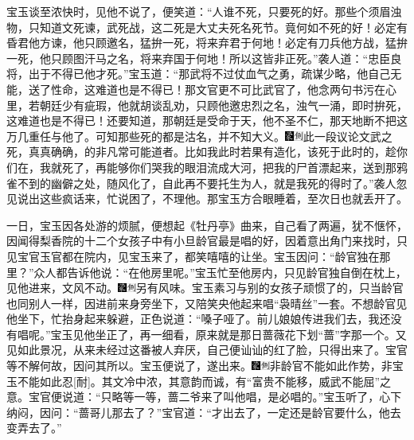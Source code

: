 宝玉谈至浓快时，见他不说了，便笑道：``人谁不死，只要死的好。那些个须眉浊物，只知道文死谏，武死战，这二死是大丈夫死名死节。竟何如不死的好！必定有昏君他方谏，他只顾邀名，猛拚一死，将来弃君于何地！必定有刀兵他方战，猛拚一死，他只顾图汗马之名，将来弃国于何地！所以这皆非正死。''袭人道：``忠臣良将，出于不得已他才死。''宝玉道：``那武将不过仗血气之勇，疏谋少略，他自己无能，送了性命，这难道也是不得已！那文官更不可比武官了，他念两句书污在心里，若朝廷少有疵瑕，他就胡谈乱劝，只顾他邀忠烈之名，浊气一涌，即时拚死，这难道也是不得已！还要知道，那朝廷是受命于天，他不圣不仁，那天地断不把这万几重任与他了。可知那些死的都是沽名，并不知大义。{\includegraphics[width=3mm]{../Images/00006}\includegraphics[width=3mm]{../Images/00011}\footnotesize \kaishu 此一段议论文武之死，真真确确，的非凡常可能道者。}比如我此时若果有造化，该死于此时的，趁你们在，我就死了，再能够你们哭我的眼泪流成大河，把我的尸首漂起来，送到那鸦雀不到的幽僻之处，随风化了，自此再不要托生为人，就是我死的得时了。''袭人忽见说出这些疯话来，忙说困了，不理他。那宝玉方合眼睡着，至次日也就丢开了。

一日，宝玉因各处游的烦腻，便想起《牡丹亭》曲来，自己看了两遍，犹不惬怀，因闻得梨香院的十二个女孩子中有小旦龄官最是唱的好，因着意出角门来找时，只见宝官玉官都在院内，见宝玉来了，都笑嘻嘻的让坐。宝玉因问：``龄官独在那里？''众人都告诉他说：``在他房里呢。''宝玉忙至他房内，只见龄官独自倒在枕上，见他进来，文风不动。{\includegraphics[width=3mm]{../Images/00006}\includegraphics[width=3mm]{../Images/00011}\footnotesize \kaishu 另有风味。}宝玉素习与别的女孩子顽惯了的，只当龄官也同别人一样，因进前来身旁坐下，又陪笑央他起来唱``袅晴丝''一套。不想龄官见他坐下，忙抬身起来躲避，正色说道：``嗓子哑了。前儿娘娘传进我们去，我还没有唱呢。''宝玉见他坐正了，再一细看，原来就是那日蔷薇花下划``蔷''字那一个。又见如此景况，从来未经过这番被人弃厌，自己便讪讪的红了脸，只得出来了。宝官等不解何故，因问其所以。宝玉便说了，遂出来。{\includegraphics[width=3mm]{../Images/00006}\includegraphics[width=3mm]{../Images/00011}\footnotesize \kaishu 非龄官不能如此作势，非宝玉不能如此忍{[}耐{]}。其文冷中浓，其意韵而诚，有``富贵不能移，威武不能屈''之意。}宝官便说道：``只略等一等，蔷二爷来了叫他唱，是必唱的。''宝玉听了，心下纳闷，因问：``蔷哥儿那去了？''宝官道：``才出去了，一定还是龄官要什么，他去变弄去了。''

